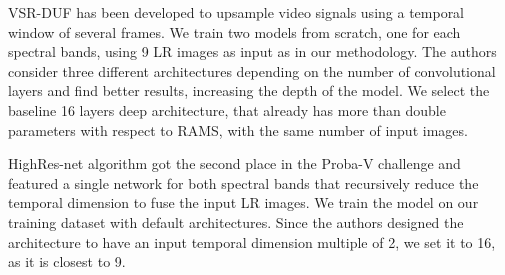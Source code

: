 \documentclass[journal]{IEEEtran}
\begin{document}
VSR-DUF\cite{jo2018deep} has been developed to upsample video signals using a temporal window of several frames. We train two models from scratch, one for each spectral bands, using 9 LR images as input as in our methodology. The authors consider three different architectures depending on the number of convolutional layers and find better results, increasing the depth of the model. We select the baseline 16 layers deep architecture, that already has more than double parameters with respect to RAMS, with the same number of input images.

HighRes-net\cite{deudon2020highres} algorithm got the second place in the Proba-V challenge and featured a single network for both spectral bands that recursively reduce the temporal dimension to fuse the input LR images. We train the model on our training dataset with default architectures. Since the authors designed the architecture to have an input temporal dimension multiple of 2, we set it to 16, as it is closest to 9.
\end{document}
